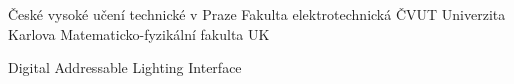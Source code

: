 

  {České vysoké učení technické v Praze}
   {Fakulta elektrotechnická ČVUT}
    {Univerzita Karlova}
   {Matematicko-fyzikální fakulta UK}

  {Digital Addressable Lighting Interface}


